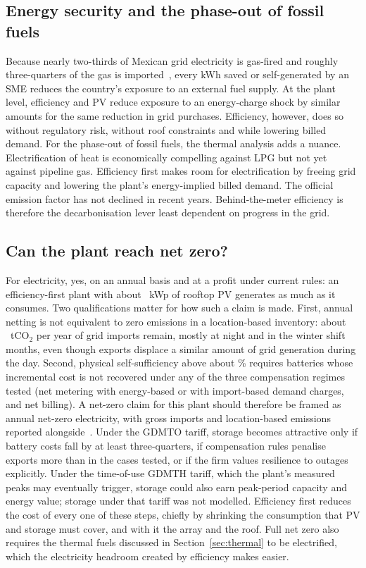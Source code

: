 \documentclass[processes,article,submit,pdftex,moreauthors]{Definitions/mdpi}
\begin{document}
\subsection{Energy security and the phase-out of fossil fuels}
Because nearly two-thirds of Mexican grid electricity is gas-fired and roughly three-quarters of the gas is imported~\cite{sener2025plan,eia2025mexico}, every kWh saved or self-generated by an SME reduces the country's exposure to an external fuel supply. At the plant level, efficiency and PV reduce exposure to an energy-charge shock by similar amounts for the same reduction in grid purchases. Efficiency, however, does so without regulatory risk, without roof constraints and while lowering billed demand. For the phase-out of fossil fuels, the thermal analysis adds a nuance. Electrification of heat is economically compelling against LPG but not yet against pipeline gas. Efficiency first makes room for electrification by freeing grid capacity and lowering the plant's energy-implied billed demand. The official emission factor has not declined in recent years. Behind-the-meter efficiency is therefore the decarbonisation lever least dependent on progress in the grid.

\subsection{Can the plant reach net zero?}
For electricity, yes, on an annual basis and at a profit under current rules: an efficiency-first plant with about \nKWpNZE~kWp of rooftop PV generates as much as it consumes. Two qualifications matter for how such a claim is made. First, annual netting is not equivalent to zero emissions in a location-based inventory: about \nCOGrossNZE~tCO$_2$ per year of grid imports remain, mostly at night and in the winter shift months, even though exports displace a similar amount of grid generation during the day. Second, physical self-sufficiency above about \nFirstBattery\% requires batteries whose incremental cost is not recovered under any of the three compensation regimes tested (net metering with energy-based or with import-based demand charges, and net billing). A net-zero claim for this plant should therefore be framed as annual net-zero electricity, with gross imports and location-based emissions reported alongside~\cite{iso50001}. Under the GDMTO tariff, storage becomes attractive only if battery costs fall by at least three-quarters, if compensation rules penalise exports more than in the cases tested, or if the firm values resilience to outages explicitly. Under the time-of-use GDMTH tariff, which the plant's measured peaks may eventually trigger, storage could also earn peak-period capacity and energy value; storage under that tariff was not modelled. Efficiency first reduces the cost of every one of these steps, chiefly by shrinking the consumption that PV and storage must cover, and with it the array and the roof. Full net zero also requires the thermal fuels discussed in Section~\ref{sec:thermal} to be electrified, which the electricity headroom created by efficiency makes easier.
\end{document}
